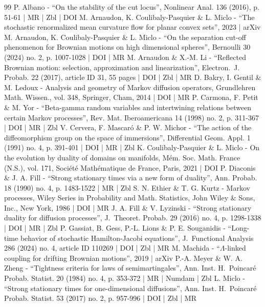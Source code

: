 \documentclass[10pt]{amsart}
\theoremstyle{plain}
\theoremstyle{definition}
\begin{document}
\begin{thebibliography}{99}
P. Albano - “On the stability of the cut locus”, Nonlinear Anal. 136 (2016), p. 51-61 | MR | Zbl | DOI
M. Arnaudon, K. Coulibaly-Pasquier \& L. Miclo - “The stochastic renormalized mean curvature flow for planar convex sets”, 2023 | arXiv
M. Arnaudon, K. Coulibaly-Pasquier \& L. Miclo - “On the separation cut-off phenomenon for Brownian motions on high dimensional spheres”, Bernoulli 30 (2024) no. 2, p. 1007-1028 | DOI | MR
M. Arnaudon \& X.-M. Li - “Reflected Brownian motion: selection, approximation and linearization”, Electron. J. Probab. 22 (2017), article ID 31, 55 pages | DOI | Zbl | MR
D. Bakry, I. Gentil \& M. Ledoux - Analysis and geometry of Markov diffusion operators, Grundlehren Math. Wissen., vol. 348, Springer, Cham, 2014 | DOI | MR
P. Carmona, F. Petit \& M. Yor - “Beta-gamma random variables and intertwining relations between certain Markov processes”, Rev. Mat. Iberoamericana 14 (1998) no. 2, p. 311-367 | DOI | MR | Zbl
V. Cervera, F. Mascaró \& P. W. Michor - “The action of the diffeomorphism group on the space of immersions”, Differential Geom. Appl. 1 (1991) no. 4, p. 391-401 | DOI | MR | Zbl
K. Coulibaly-Pasquier \& L. Miclo - On the evolution by duality of domains on manifolds, Mém. Soc. Math. France (N.S.), vol. 171, Société Mathématique de France, Paris, 2021 | DOI
P. Diaconis \& J. A. Fill - “Strong stationary times via a new form of duality”, Ann. Probab. 18 (1990) no. 4, p. 1483-1522 | MR | Zbl
S. N. Ethier \& T. G. Kurtz - Markov processes, Wiley Series in Probability and Math. Statistics, John Wiley \& Sons, Inc., New York, 1986 | DOI | MR
J. A. Fill \& V. Lyzinski - “Strong stationary duality for diffusion processes”, J. Theoret. Probab. 29 (2016) no. 4, p. 1298-1338 | DOI | MR | Zbl
P. Gassiat, B. Gess, P.-L. Lions \& P. E. Souganidis - “Long-time behavior of stochastic Hamilton-Jacobi equations”, J. Functional Analysis 286 (2024) no. 4, article ID 110269 | DOI | Zbl | MR
M. Machida - “$\Lambda $-linked coupling for drifting Brownian motions”, 2019 | arXiv
P.-A. Meyer \& W. A. Zheng - “Tightness criteria for laws of semimartingales”, Ann. Inst. H. Poincaré Probab. Statist. 20 (1984) no. 4, p. 353-372 | MR | Numdam | Zbl
L. Miclo - “Strong stationary times for one-dimensional diffusions”, Ann. Inst. H. Poincaré Probab. Statist. 53 (2017) no. 2, p. 957-996 | DOI | Zbl | MR

\end{thebibliography}
\end{document}
